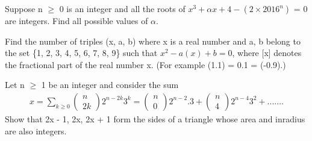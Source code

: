 \item Suppose n $\geq$ 0 is an integer and all the roots of $x^{3} + \alpha x + 4 - (2 \times 2016^{n})$ = 0
are integers. Find all possible values of $\alpha$.


\item Find the number of triples (x, a, b) where x is a real number and a, b belong to
the set \{1, 2, 3, 4, 5, 6, 7, 8, 9\} such that $x^{2} - a(x) + b = 0$,
where [x] denotes the fractional part of the real number x. (For example
(1.1) = 0.1 = (-0.9).)

\item Let n $\geq$ 1 be an integer and consider the sum
\begin{align*}
x = \sum_{k \geq 0} \begin{pmatrix} n \\ 2k \end{pmatrix} 2^{n-2k}3^{k} = \begin{pmatrix} n \\ 0 \end{pmatrix} 2^{n-2}.3 + \begin{pmatrix} n \\ 4 \end{pmatrix} 2^{n-4}3^{2} + .......
\end{align*}
Show that 2x - 1, 2x, 2x + 1 form the sides of a triangle whose area and inradius are also integers.












